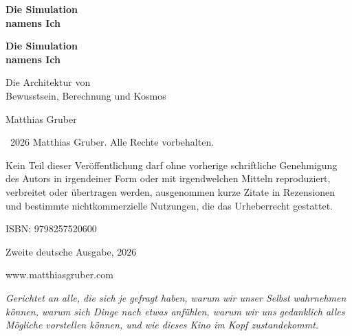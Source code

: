 \documentclass[11pt, twoside, openright]{book}
\makeatletter
\def\cleardoublepage{\clearpage\if@twoside \ifodd\c@page\else
  \thispagestyle{empty}\hbox{}\newpage
  \if@twocolumn\hbox{}\newpage\fi\fi\fi}
\makeatother
\begin{document}
\frontmatter
\pagestyle{empty}

\vspace*{3in}
\begin{center}
{\Huge\bfseries Die Simulation\\[0.3cm] namens Ich\par}
\end{center}
\cleardoublepage

\vspace*{2in}
\begin{center}
{\Huge\bfseries Die Simulation\\[0.3cm] namens Ich\par}
\vspace{0.8cm}
{\Large Die Architektur von\\[0.2cm] Bewusstsein, Berechnung und Kosmos\par}
\vspace{2cm}
{\large Matthias Gruber\par}
\end{center}
\clearpage

\thispagestyle{empty}
\vspace*{\fill}
{\small
\noindent \textcopyright\ 2026 Matthias Gruber. Alle Rechte vorbehalten.\par
\vspace{0.5cm}
\noindent Kein Teil dieser Veröffentlichung darf ohne vorherige schriftliche
Genehmigung des Autors in irgendeiner Form oder mit irgendwelchen Mitteln
reproduziert, verbreitet oder übertragen werden, ausgenommen kurze Zitate
in Rezensionen und bestimmte nichtkommerzielle Nutzungen, die das
Urheberrecht gestattet.\par
\vspace{0.5cm}
\noindent ISBN: 9798257520600\par
\vspace{0.5cm}
\noindent Zweite deutsche Ausgabe, 2026\par
\vspace{0.5cm}
\noindent www.matthiasgruber.com\par
}
\cleardoublepage

\thispagestyle{empty}
\vspace*{3in}
\begin{center}
\begin{minipage}{0.75\textwidth}
\centering
\textit{Gerichtet an alle, die sich je gefragt haben, warum wir unser Selbst
wahrnehmen können, warum sich Dinge nach etwas anfühlen, warum wir uns
gedanklich alles Mögliche vorstellen können, und wie dieses Kino im Kopf
zustandekommt.}
\end{minipage}
\end{center}
\cleardoublepage
\end{document}
